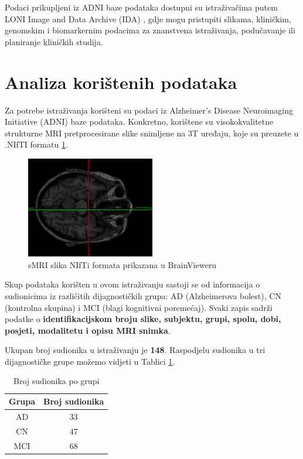 \documentclass[zavrsnirad,upload]{fer}
\begin{document}
Podaci prikupljeni iz ADNI baze podataka dostupni su istraživačima putem LONI Image and Data Archive (IDA) \cite{usc_loni}, gdje mogu pristupiti slikama, kliničkim, genomskim i biomarkernim podacima za znanstvena istraživanja, podučavanje ili planiranje kliničkih studija.

\section{Analiza korištenih podataka}
Za potrebe istraživanja korišteni su podaci iz Alzheimer's Disease Neuroimaging Initiative (ADNI) baze podataka. Konkretno, korištene su visokokvalitetne strukturne MRI pretprocesirane slike snimljene na 3T uređaju, koje su preuzete u .NIfTI formatu \ref{fig:nifti}.

\begin{figure}[h]
	\centering
	\includegraphics[width=0.5\textwidth]{Figures/primjer_slike.png}
	\caption{sMRI slika NIfTi formata prikazana u BrainVieweru\cite{umich_brainviewer}}
	\label{fig:nifti}
\end{figure}


Skup podataka korišten u ovom istraživanju sastoji se od informacija o sudionicima iz različitih dijagnostičkih grupa: AD (Alzheimerova bolest), CN (kontrolna skupina) i MCI (blagi kognitivni poremećaj). Svaki zapis sadrži podatke o \textbf{identifikacijskom broju slike, subjektu, grupi, spolu, dobi, posjeti, modalitetu i opisu MRI snimka}.

Ukupan broj sudionika u istraživanju je \textbf{148}. Raspodjelu sudionika u tri dijagnostičke grupe možemo vidjeti u Tablici \ref{tab:brojsudionikapogrupi}.

\begin{table}[ht]
	\centering
	\begin{tabular}{|c|c|}
		\hline
		\textbf{Grupa} & \textbf{Broj sudionika} \\
		\hline
		AD & 33 \\
		CN & 47 \\
		MCI & 68 \\
		\hline
	\end{tabular}
	\caption{Broj sudionika po grupi}
	\label{tab:brojsudionikapogrupi}
\end{table}
\end{document}
